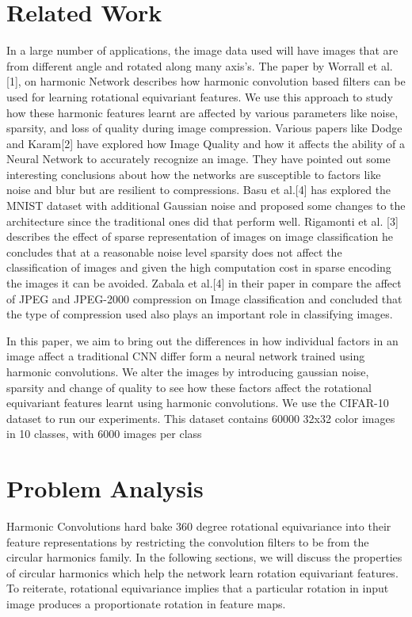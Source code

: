 \documentclass{article}
\begin{document}

\section{Related Work}
In a large number of applications, the image data used will have images that are from different angle and rotated along many axis’s. The paper by Worrall et al. [1], on harmonic Network describes how harmonic convolution based filters can be used for learning rotational equivariant features. We use this approach to study how these harmonic features learnt are affected by various parameters like noise, sparsity, and loss of quality during image compression. Various papers like Dodge and Karam[2] have explored how Image Quality and how it affects the ability of a Neural Network to accurately recognize an image. They have pointed out some interesting conclusions about how the networks are susceptible to factors like noise and blur but are resilient to compressions. Basu et al.[4] has explored the MNIST dataset with additional Gaussian noise and proposed some changes to the architecture since the traditional ones did that perform well. Rigamonti et al. [3] describes the effect of sparse representation of images on image classification he concludes that at a reasonable noise level sparsity does not affect the classification of images and given the high computation cost in sparse encoding the images it can be avoided. Zabala et al.[4] in their paper in compare the affect of JPEG and JPEG-2000 compression on Image classification and concluded that the type of compression used also plays an important role in classifying images.

In this paper, we aim to bring out the differences in how individual factors in an image affect a traditional CNN differ form a neural network trained using harmonic convolutions. We alter the images by introducing gaussian noise, sparsity and change of quality to see how these factors affect the rotational equivariant features learnt using harmonic convolutions. We use the CIFAR-10 dataset to run our experiments. This dataset contains 60000 32x32 color images in 10 classes, with 6000 images per class


\section{Problem Analysis}
Harmonic Convolutions hard bake 360 degree rotational equivariance into their feature representations by restricting the convolution filters to be from the circular harmonics family. In the following sections, we will discuss the properties of circular harmonics which help the network learn rotation equivariant features. To reiterate, rotational equivariance implies that a particular rotation in input image produces a proportionate rotation in feature maps.
\end{document}
